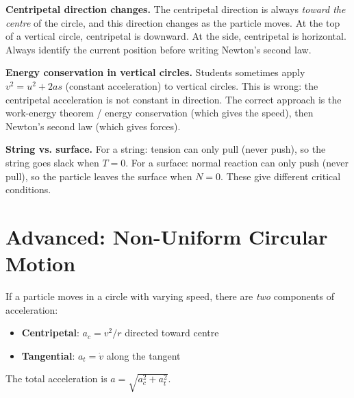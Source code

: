 \documentclass[12pt, a4paper]{book}
\begin{document}
\begin{warningbox}
\textbf{Centripetal direction changes.} The centripetal direction is always \emph{toward the centre} of the circle, and this direction changes as the particle moves. At the top of a vertical circle, centripetal is downward. At the side, centripetal is horizontal. Always identify the current position before writing Newton's second law.
\end{warningbox}

\begin{examtrap}
\textbf{Energy conservation in vertical circles.}
Students sometimes apply $v^2 = u^2 + 2as$ (constant acceleration) to vertical circles. This is wrong: the centripetal acceleration is not constant in direction. The correct approach is the work-energy theorem / energy conservation (which gives the speed), then Newton's second law (which gives forces).
\end{examtrap}

\begin{warningbox}
\textbf{String vs. surface.}
For a string: tension can only pull (never push), so the string goes slack when $T = 0$.
For a surface: normal reaction can only push (never pull), so the particle leaves the surface when $N = 0$.
These give different critical conditions.
\end{warningbox}

\section{Advanced: Non-Uniform Circular Motion}

If a particle moves in a circle with varying speed, there are \emph{two} components of acceleration:
\begin{itemize}[leftmargin=2em]
  \item \textbf{Centripetal}: $a_c = v^2/r$ directed toward centre
  \item \textbf{Tangential}: $a_t = \dot{v}$ along the tangent
\end{itemize}
The total acceleration is $a = \sqrt{a_c^2 + a_t^2}$.
\end{document}
